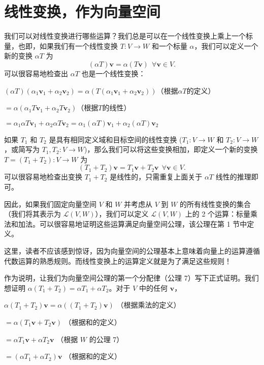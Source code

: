 \section{线性变换，作为向量空间}

我们可以对线性变换进行哪些运算？我们总是可以在一个线性变换上乘上一个标量，也即，如果我们有一个线性变换 $T: V \to W$ 和一个标量 $\alpha$，我们可以定义一个新的变换 $\alpha T$ 为 $$(\alpha T) \mathbf{v} = \alpha (T \mathbf{v})~~\forall \mathbf{v} \in V.$$
可以很容易地检查出 $\alpha T$ 也是一个线性变换：



$(\alpha T )(\alpha_1 \mathbf{v}_1 + \alpha_2 \mathbf{v}_2)= \alpha( T (\alpha_1 \mathbf{v}_1 + \alpha_2 \mathbf{v}_2))$（根据$\alpha T$的定义）

$= \alpha (\alpha_1 T \mathbf{v}_1 + \alpha_2 T \mathbf{v}_2)$（根据$T$的线性）

$= \alpha_1 \alpha T \mathbf{v}_1 +\alpha_2  \alpha T \mathbf{v}_2  = \alpha_1( \alpha T) \mathbf{v}_1 +\alpha_2( \alpha T) \mathbf{v}_2   $

如果 $T_1$ 和 $T_2$ 是具有相同定义域和目标空间的线性变换 ($T_1: V \to W$ 和 $T_2: V \to W$，或简写为 $T_1, T_2: V \to W$)，那么我们可以将这些变换相加，即定义一个新的变换 $T = (T_1 + T_2): V \to W$ 为 $$(T_1 + T_2) \mathbf{v} = T_1 \mathbf{v} + T_2 \mathbf{v}~~\forall \mathbf{v} \in V.$$
可以很容易地检查出变换 $T_1 + T_2$ 是线性的，只需重复上面关于 $\alpha T$ 线性的推理即可。

因此，如果我们固定向量空间 $V$ 和 $W$ 并考虑从 $V$ 到 $W$ 的所有线性变换的集合（我们将其表示为 $\mathcal{L}(V, W)$），我们可以定义 $\mathcal{L}(V, W)$ 上的 2 个运算：标量乘法和加法。可以很容易地证明这些运算满足向量空间公理，该公理在第 1 节中定义。

这里，读者不应该感到惊讶，因为向量空间的公理基本上意味着向量上的运算遵循代数运算的熟悉规则。而线性变换上的运算定义就是为了满足这些规则！

作为说明，让我们为向量空间公理的第一个分配律（公理 7）写下正式证明。我们想证明 $\alpha (T_1 + T_2) = \alpha T_1 + \alpha T_2$。对于 $V$ 中的任何 $\mathbf{v}$，

$\alpha (T_1 + T_2) \mathbf{v} = \alpha ((T_1 + T_2) \mathbf{v})$ （根据乘法的定义）

$= \alpha (T_1 \mathbf{v} + T_2 \mathbf{v})$ （根据和的定义）

$= \alpha T_1 \mathbf{v} + \alpha T_2 \mathbf{v}$ （根据 $W$ 的公理 7）

$= (\alpha T_1 + \alpha T_2) \mathbf{v}$ （根据和的定义）

